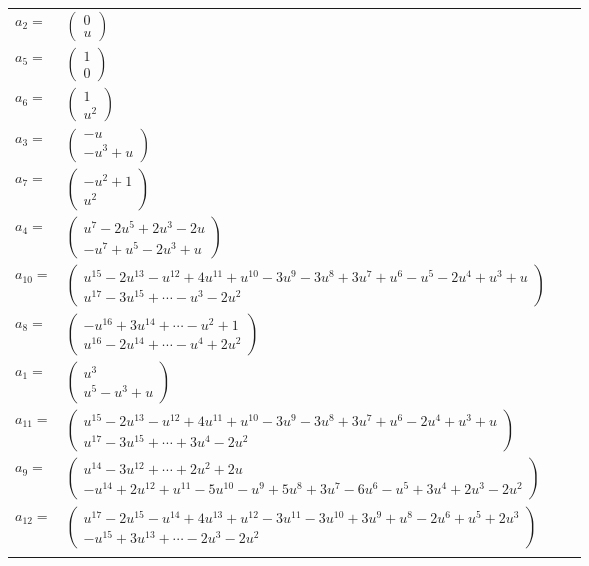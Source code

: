 \documentclass[1p]{elsarticle_modified}
\theoremstyle{definition}
\begin{document}
\begin{tabular}{m{7pt} m{180pt} m{7pt} m{180pt} }
\flushright $a_{2}=$&$\begin{pmatrix}0\\u\end{pmatrix}$ \\
\flushright $a_{5}=$&$\begin{pmatrix}1\\0\end{pmatrix}$ \\
\flushright $a_{6}=$&$\begin{pmatrix}1\\u^2\end{pmatrix}$ \\
\flushright $a_{3}=$&$\begin{pmatrix}- u\\- u^3+u\end{pmatrix}$ \\
\flushright $a_{7}=$&$\begin{pmatrix}- u^2+1\\u^2\end{pmatrix}$ \\
\flushright $a_{4}=$&$\begin{pmatrix}u^7-2 u^5+2 u^3-2 u\\- u^7+u^5-2 u^3+u\end{pmatrix}$ \\
\flushright $a_{10}=$&$\begin{pmatrix}u^{15}-2 u^{13}- u^{12}+4 u^{11}+u^{10}-3 u^9-3 u^8+3 u^7+u^6- u^5-2 u^4+u^3+u\\u^{17}-3 u^{15}+\cdots- u^3-2 u^2\end{pmatrix}$ \\
\flushright $a_{8}=$&$\begin{pmatrix}- u^{16}+3 u^{14}+\cdots- u^2+1\\u^{16}-2 u^{14}+\cdots- u^4+2 u^2\end{pmatrix}$ \\
\flushright $a_{1}=$&$\begin{pmatrix}u^3\\u^5- u^3+u\end{pmatrix}$ \\
\flushright $a_{11}=$&$\begin{pmatrix}u^{15}-2 u^{13}- u^{12}+4 u^{11}+u^{10}-3 u^9-3 u^8+3 u^7+u^6-2 u^4+u^3+u\\u^{17}-3 u^{15}+\cdots+3 u^4-2 u^2\end{pmatrix}$ \\
\flushright $a_{9}=$&$\begin{pmatrix}u^{14}-3 u^{12}+\cdots+2 u^2+2 u\\- u^{14}+2 u^{12}+u^{11}-5 u^{10}- u^9+5 u^8+3 u^7-6 u^6- u^5+3 u^4+2 u^3-2 u^2\end{pmatrix}$ \\
\flushright $a_{12}=$&$\begin{pmatrix}u^{17}-2 u^{15}- u^{14}+4 u^{13}+u^{12}-3 u^{11}-3 u^{10}+3 u^9+u^8-2 u^6+u^5+2 u^3\\- u^{15}+3 u^{13}+\cdots-2 u^3-2 u^2\end{pmatrix}$\\&\end{tabular}
\end{document}
